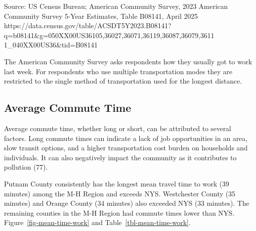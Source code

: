 \documentclass[
  english,
  letterpaper,
]{report}
\begin{document}
\begin{tcolorbox}[enhanced jigsaw, breakable, leftrule=.75mm, title=\textcolor{quarto-callout-note-color}{\faInfo}\hspace{0.5em}{Source}, bottomrule=.15mm, opacityback=0, left=2mm, colback=white, bottomtitle=1mm, coltitle=black, colbacktitle=quarto-callout-note-color!10!white, colframe=quarto-callout-note-color-frame, opacitybacktitle=0.6, toptitle=1mm, titlerule=0mm, arc=.35mm, rightrule=.15mm, toprule=.15mm]

Source: US Census Bureau; American Community Survey, 2023 American
Community Survey 5-Year Estimates, Table B08141, April 2025
https://data.census.gov/table/ACSDT5Y2023.B08141?q=b08141\&g=050XX00US36105,36027,36071,36119,36087,36079,3611
1\_040XX00US36\&tid=B08141

\end{tcolorbox}

\begin{tcolorbox}[enhanced jigsaw, breakable, leftrule=.75mm, title=\textcolor{quarto-callout-note-color}{\faInfo}\hspace{0.5em}{Note}, bottomrule=.15mm, opacityback=0, left=2mm, colback=white, bottomtitle=1mm, coltitle=black, colbacktitle=quarto-callout-note-color!10!white, colframe=quarto-callout-note-color-frame, opacitybacktitle=0.6, toptitle=1mm, titlerule=0mm, arc=.35mm, rightrule=.15mm, toprule=.15mm]

The American Community Survey asks respondents how they usually got to
work last week. For respondents who use multiple transportation modes
they are restricted to the single method of transportation used for the
longest distance.

\end{tcolorbox}

\subsection{Average Commute Time}\label{average-commute-time}

Average commute time, whether long or short, can be attributed to
several factors. Long commute times can indicate a lack of job
opportunities in an area, slow transit options, and a higher
transportation cost burden on households and individuals. It can also
negatively impact the community as it contributes to pollution (77).

Putnam County consistently has the longest mean travel time to work (39
minutes) among the M-H Region and exceeds NYS. Westchester County (35
minutes) and Orange County (34 minutes) also exceeded NYS (33 minutes).
The remaining counties in the M-H Region had commute times lower than
NYS. Figure~\ref{fig-mean-time-work} and Table~\ref{tbl-mean-time-work}.
\end{document}
